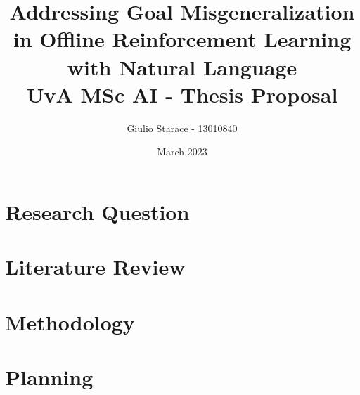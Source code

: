 \documentclass[12pt]{report}
\title{
Addressing Goal Misgeneralization in Offline Reinforcement Learning with Natural Language
\\
\Large UvA MSc AI - Thesis Proposal
}
\begin{document}
\author{Giulio Starace - 13010840}
\date{March 2023}
\maketitle

\chapter{Research Question} \label{chap:intro}


\chapter{Literature Review}


\chapter{Methodology}


\chapter{Planning}




\end{document}
